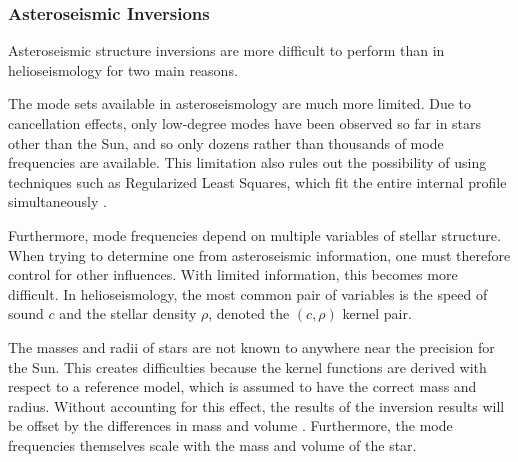 \subsubsection*{Asteroseismic Inversions}

Asteroseismic structure inversions are more difficult to perform than in helioseismology for two main reasons. 
\begin{description}
    \setlength{\itemindent}{0pt}
    \item[Mode set.]
    The mode sets available in asteroseismology are much more limited. 
    Due to cancellation effects, only low-degree modes have been observed so far in stars other than the Sun, and so only dozens rather than thousands of mode frequencies are available. 
    This limitation also rules out the possibility of using techniques such as Regularized Least Squares, which fit the entire internal profile simultaneously \citep[see, e.g.,][]{basuchaplin2017}. 
    
    Furthermore, mode frequencies depend on multiple variables of stellar structure.
    When trying to determine one from asteroseismic information, one must therefore control for other influences. 
    With limited information, this becomes more difficult. 
    In helioseismology, the most common pair of variables is the speed of sound $c$ and the stellar density $\rho$, denoted the ${(c,\rho)}$ kernel pair. 
    
    \item[Mass and radius.]
    The masses and radii of stars are not known to anywhere near the precision for the Sun. 
    This creates difficulties because the kernel functions are derived with respect to a reference model, which is assumed to have the correct mass and radius. 
    Without accounting for this effect, the results of the inversion results will be offset by the differences in mass and volume \citep[][]{2003Ap&SS.284..153B}. 
    Furthermore, the mode frequencies themselves scale with the mass and volume of the star. 
\end{description}

